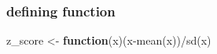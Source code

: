 \documentclass[
]{book}
\newenvironment{Shaded}{\begin{snugshade}}{\end{snugshade}}
\newcommand{\ControlFlowTok}[1]{\textcolor[rgb]{0.13,0.29,0.53}{\textbf{#1}}}
\newcommand{\FunctionTok}[1]{\textcolor[rgb]{0.00,0.00,0.00}{#1}}
\newcommand{\NormalTok}[1]{#1}
\newcommand{\OtherTok}[1]{\textcolor[rgb]{0.56,0.35,0.01}{#1}}
\newcommand{\SpecialCharTok}[1]{\textcolor[rgb]{0.00,0.00,0.00}{#1}}
\theoremstyle{definition}
\theoremstyle{definition}
\theoremstyle{definition}
\theoremstyle{definition}
\theoremstyle{remark}
\begin{document}
\hypertarget{defining-function}{%
\subsubsection{defining function}\label{defining-function}}

\begin{Shaded}
\begin{Highlighting}[]
\NormalTok{z\_score }\OtherTok{\textless{}{-}} \ControlFlowTok{function}\NormalTok{(x)(x}\SpecialCharTok{{-}}\FunctionTok{mean}\NormalTok{(x))}\SpecialCharTok{/}\FunctionTok{sd}\NormalTok{(x)}
\end{Highlighting}
\end{Shaded}

\begin{Shaded}
\end{Shaded}
\end{document}

